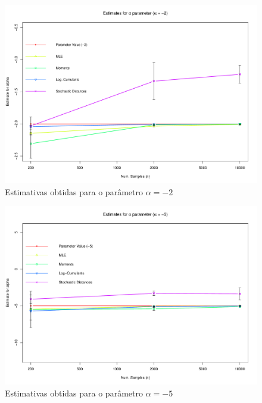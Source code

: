 \begin{figure}[H]
     \centering
     \includegraphics[scale=0.5]{plots/ComparisonAlpha-2.pdf}
     \caption{Estimativas obtidas para o parâmetro $\alpha = -2$}
     \label{graf_5}
\end{figure}
\begin{figure}[H]
     \centering
     \includegraphics[scale=0.5]{plots/ComparisonAlpha-5.pdf}
     \caption{Estimativas obtidas para o parâmetro $\alpha = -5$}
     \label{graf_6}
\end{figure}
